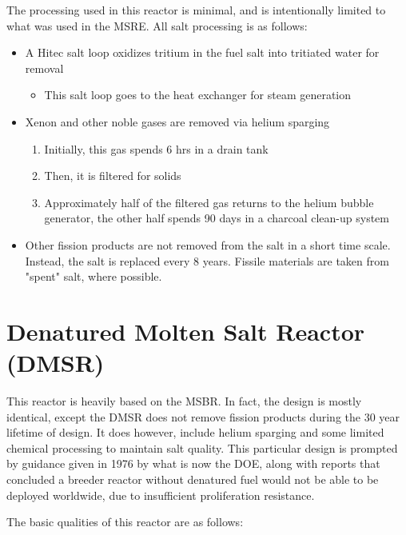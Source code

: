 \documentclass[letterpaper]{article}
\begin{document}
The processing used in this reactor is minimal, and is intentionally limited to what was used in the MSRE.  All salt processing is as follows:

\begin{itemize}
\item A Hitec salt loop oxidizes tritium in the fuel salt into tritiated water for removal
	\begin{itemize}
	\item This salt loop goes to the heat exchanger for steam generation
	\end{itemize}
\item Xenon and other noble gases are removed via helium sparging
	\begin{enumerate}
	\item Initially, this gas spends 6 hrs in a drain tank
	\item Then, it is filtered for solids
	\item Approximately half of the filtered gas returns to the helium bubble generator, the other half spends 90 days in a charcoal clean-up system
	\end{enumerate}
\item Other fission products are not removed from the salt in a short time scale.  Instead, the salt is replaced every 8 years.  Fissile materials are taken from "spent" salt, where possible.
\end{itemize}

\section{Denatured Molten Salt Reactor (DMSR)}

This reactor is heavily based on the MSBR.  In fact, the design is mostly identical, except the DMSR does not remove fission products during the 30 year lifetime of design.  It does however, include helium sparging and some limited chemical processing to maintain salt quality.  This particular design is prompted by guidance given in 1976 by what is now the DOE, along with reports that concluded a breeder reactor without denatured fuel would not be able to be deployed worldwide, due to insufficient proliferation resistance. \cite{engel_conceptual_1980}

The basic qualities of this reactor are as follows:
\end{document}
